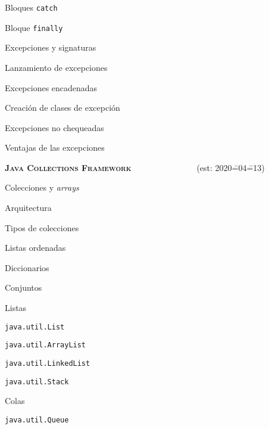 \begin{longenum}
\begin{longenum}
\begin{longenum}
            \item Bloques \texttt{catch}
            \item Bloque \texttt{finally}
        \end{longenum}
        \item Excepciones y signaturas
        \item Lanzamiento de excepciones
        \begin{longenum}
            \item Excepciones encadenadas
            \item Creación de clases de excepción
        \end{longenum}
        \item Excepciones no chequeadas
        \item Ventajas de las excepciones
    \end{longenum}
    \item \textbf{\textsc{Java Collections Framework}} \ \ \ \ \ \ \ \ \ \ \ \ \ \ \ (est: 2020\==04\==13)
    \begin{longenum}
        \item Colecciones y \textit{arrays}
        \item Arquitectura
        \item Tipos de colecciones
        \begin{longenum}
            \item Listas ordenadas
            \item Diccionarios
            \item Conjuntos
        \end{longenum}
        \item Listas
        \begin{longenum}
            \item \texttt{java.util.List}
            \begin{longenum}
                \item \texttt{java.util.ArrayList}
                \item \texttt{java.util.LinkedList}
                \item \texttt{java.util.Stack}
            \end{longenum}
        \end{longenum}
        \item Colas
        \begin{longenum}
            \item \texttt{java.util.Queue}

\end{longenum}
\end{longenum}
\end{longenum}
